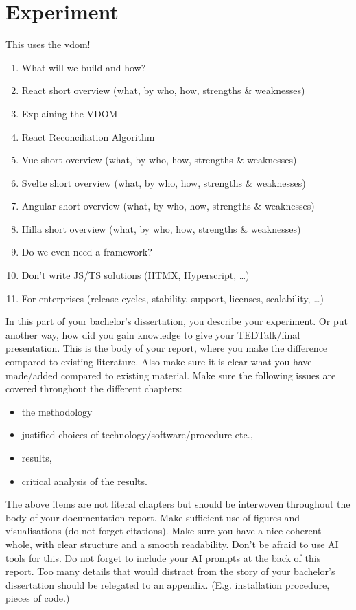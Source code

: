 \chapter{Experiment}





This uses the \acrshort{vdom}!


\begin{enumerate}
    \item What will we build and how?
    \item React short overview (what, by who, how, strengths \& weaknesses)
    \item Explaining the VDOM
    \item React Reconciliation Algorithm
    \item Vue short overview (what, by who, how, strengths \& weaknesses)
    \item Svelte short overview (what, by who, how, strengths \& weaknesses)
    \item Angular short overview (what, by who, how, strengths \& weaknesses)
    \item Hilla short overview (what, by who, how, strengths \& weaknesses)
    \item Do we even need a framework?
    \item Don’t write JS/TS solutions (HTMX, Hyperscript, …) 
    \item For enterprises (release cycles, stability, support, licenses, scalability, …) 
\end{enumerate}

In this part of your bachelor's dissertation, you describe your experiment. Or put another way, how did you gain knowledge to give your TEDTalk/final presentation. 
This is the body of your report, where you make the difference compared to existing literature. Also make sure it is clear what you have made/added compared to existing material.
Make sure the following issues are covered throughout the different chapters:
\begin{itemize}
    \item the methodology
    \item justified choices of technology/software/procedure etc., 
    \item results, 
    \item critical analysis of the results. 
\end{itemize}
The above items are not literal chapters but should be interwoven throughout the body of your documentation report.
Make sufficient use of figures and visualisations (do not forget citations). Make sure you have a nice coherent whole, with clear structure and a smooth readability. Don't be afraid to use AI tools for this. Do not forget to include your AI prompts at the back of this report.
Too many details that would distract from the story of your bachelor's dissertation should be relegated to an appendix. (E.g. installation procedure, pieces of code.) 
